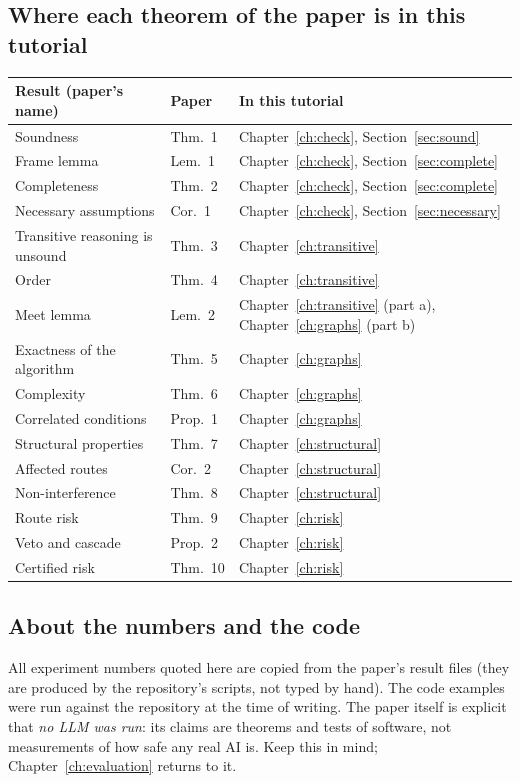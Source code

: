 \subsection*{Where each theorem of the paper is in this tutorial}

\begin{center}
\renewcommand{\arraystretch}{1.15}
\begin{tabularx}{\textwidth}{@{}p{4.1cm}p{2.1cm}X@{}}
\toprule
\textbf{Result (paper's name)} & \textbf{Paper} & \textbf{In this tutorial}\\
\midrule
Soundness & Thm.~1 & Chapter~\ref{ch:check}, Section~\ref{sec:sound}\\
Frame lemma & Lem.~1 & Chapter~\ref{ch:check}, Section~\ref{sec:complete}\\
Completeness & Thm.~2 & Chapter~\ref{ch:check}, Section~\ref{sec:complete}\\
Necessary assumptions & Cor.~1 & Chapter~\ref{ch:check}, Section~\ref{sec:necessary}\\
Transitive reasoning is unsound & Thm.~3 & Chapter~\ref{ch:transitive}\\
Order & Thm.~4 & Chapter~\ref{ch:transitive}\\
Meet lemma & Lem.~2 & Chapter~\ref{ch:transitive} (part a), Chapter~\ref{ch:graphs} (part b)\\
Exactness of the algorithm & Thm.~5 & Chapter~\ref{ch:graphs}\\
Complexity & Thm.~6 & Chapter~\ref{ch:graphs}\\
Correlated conditions & Prop.~1 & Chapter~\ref{ch:graphs}\\
Structural properties & Thm.~7 & Chapter~\ref{ch:structural}\\
Affected routes & Cor.~2 & Chapter~\ref{ch:structural}\\
Non-interference & Thm.~8 & Chapter~\ref{ch:structural}\\
Route risk & Thm.~9 & Chapter~\ref{ch:risk}\\
Veto and cascade & Prop.~2 & Chapter~\ref{ch:risk}\\
Certified risk & Thm.~10 & Chapter~\ref{ch:risk}\\
\bottomrule
\end{tabularx}
\end{center}

\subsection*{About the numbers and the code}

All experiment numbers quoted here are copied from the paper's result files (they are produced by the repository's scripts, not typed by hand). The code examples were run against the repository at the time of writing. The paper itself is explicit that \emph{no LLM was run}: its claims are theorems and tests of software, not measurements of how safe any real AI is. Keep this in mind; Chapter~\ref{ch:evaluation} returns to it.

\clearpage
\setcounter{q}{0}
